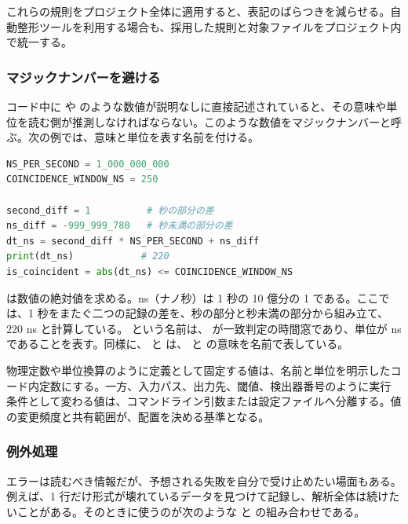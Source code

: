 これらの規則をプロジェクト全体に適用すると、表記のばらつきを減らせる。自動整形ツールを利用する場合も、採用した規則と対象ファイルをプロジェクト内で統一する。

\subsubsection{マジックナンバーを避ける}
\label{sec:magic-number}

コード中に  や  のような数値が説明なしに直接記述されていると、その意味や単位を読む側が推測しなければならない。このような数値をマジックナンバーと呼ぶ。次の例では、意味と単位を表す名前を付ける。

\begin{lstlisting}[language=Python]
NS_PER_SECOND = 1_000_000_000
COINCIDENCE_WINDOW_NS = 250

second_diff = 1          # 秒の部分の差
ns_diff = -999_999_780   # 秒未満の部分の差
dt_ns = second_diff * NS_PER_SECOND + ns_diff
print(dt_ns)            # 220
is_coincident = abs(dt_ns) <= COINCIDENCE_WINDOW_NS
\end{lstlisting}

 は数値の絶対値を求める。ns（ナノ秒）は 1 秒の 10 億分の 1 である。ここでは、1 秒をまたぐ二つの記録の差を、秒の部分と秒未満の部分から組み立て、220 ns と計算している。 という名前は、 が一致判定の時間窓であり、単位が ns であることを表す。同様に、 と  は、 と  の意味を名前で表している。

物理定数や単位換算のように定義として固定する値は、名前と単位を明示したコード内定数にする。一方、入力パス、出力先、閾値、検出器番号のように実行条件として変わる値は、コマンドライン引数または設定ファイルへ分離する。値の変更頻度と共有範囲が、配置を決める基準となる。

\subsubsection{例外処理}

エラーは読むべき情報だが、予想される失敗を自分で受け止めたい場面もある。例えば、1 行だけ形式が壊れているデータを見つけて記録し、解析全体は続けたいことがある。そのときに使うのが次のような  と  の組み合わせである。

